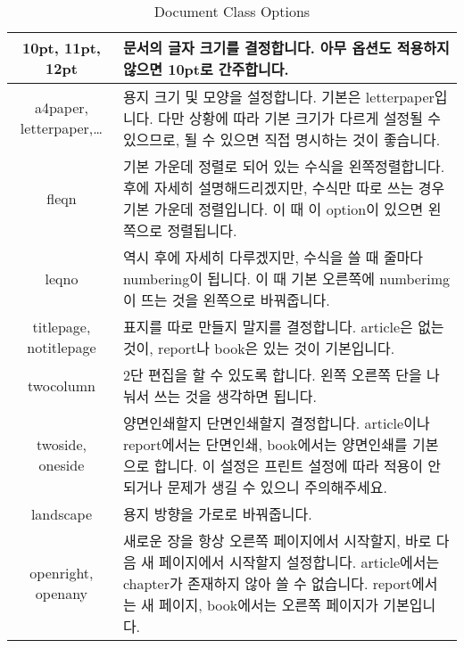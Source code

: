 \begin{table}[h]
	\centering
	\begin{tabular}{|c|m{320pt}|}
		\hline
		10pt, 11pt, 12pt & 문서의 글자 크기를 결정합니다. 아무 옵션도 적용하지 않으면 10pt로 간주합니다.\\
		\hline
		a4paper, letterpaper,\dots & 용지 크기 및 모양을 설정합니다. 기본은 letterpaper입니다. 다만 상황에 따라 기본 크기가 다르게 설정될 수 있으므로, 될 수 있으면 직접 명시하는 것이 좋습니다.\\
		\hline
		fleqn & 기본 가운데 정렬로 되어 있는 수식을 왼쪽정렬합니다. 후에 자세히 설명해드리겠지만, 수식만 따로 쓰는 경우 기본 가운데 정렬입니다. 이 때 이 option이 있으면 왼쪽으로 정렬됩니다.\\
		\hline
		leqno & 역시 후에 자세히 다루겠지만, 수식을 쓸 때 줄마다 numbering이 됩니다. 이 때 기본 오른쪽에 numberimg이 뜨는 것을 왼쪽으로 바꿔줍니다.\\
		\hline
		titlepage, notitlepage & 표지를 따로 만들지 말지를 결정합니다. article은 없는 것이, report나 book은 있는 것이 기본입니다.\\
		\hline
		twocolumn & 2단 편집을 할 수 있도록 합니다. 왼쪽 오른쪽 단을 나눠서 쓰는 것을 생각하면 됩니다.\\
		\hline
		twoside, oneside & 양면인쇄할지 단면인쇄할지 결정합니다. article이나 report에서는 단면인쇄, book에서는 양면인쇄를 기본으로 합니다. 이 설정은 프린트 설정에 따라 적용이 안 되거나 문제가 생길 수 있으니 주의해주세요.\\
		\hline
		landscape & 용지 방향을 가로로 바꿔줍니다.\\
		\hline
		openright, openany & 새로운 장을 항상 오른쪽 페이지에서 시작할지, 바로 다음 새 페이지에서 시작할지 설정합니다. article에서는 chapter가 존재하지 않아 쓸 수 없습니다. report에서는 새 페이지, book에서는 오른쪽 페이지가 기본입니다.\\
		\hline
	\end{tabular}
        \caption{Document Class Options}
        \label{tab:doc cls opt}
      \end{table}
